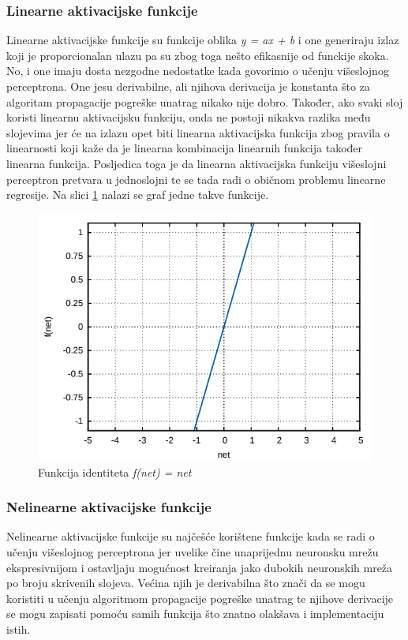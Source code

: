 \documentclass[times, utf8, zavrsni]{fer}
\begin{document}
\subsubsection{Linearne aktivacijske funkcije}
Linearne aktivacijske funkcije su funkcije oblika \textit{y = ax + b} i one generiraju izlaz koji je proporcionalan ulazu pa su zbog toga nešto efikasnije od funckije skoka. No, i one imaju dosta nezgodne nedostatke kada govorimo o učenju višeslojnog perceptrona. One jesu derivabilne, ali njihova derivacija je konstanta što za algoritam propagacije pogreške unatrag nikako nije dobro. Također, ako svaki sloj koristi linearnu aktivacijsku funkciju, onda ne postoji nikakva razlika među slojevima jer će na izlazu opet biti linearna aktivacijska funkcija zbog pravila o linearnosti koji kaže da je linearna kombinacija linearnih funkcija također linearna funkcija. Posljedica toga je da linearna aktivacijska funkciju višeslojni perceptron pretvara u jednoslojni te se tada radi o običnom problemu linearne regresije. Na slici \ref{fig:id-fun} nalazi se graf jedne takve funkcije.

\begin{figure}[H]
    \centering
    \includegraphics[scale=0.5]{img/id-fun.png}
    \caption[Caption for LOF]{Funkcija identiteta \textit{f(net) = net}\footnotemark}
    \label{fig:id-fun}
\end{figure}

\subsubsection{Nelinearne aktivacijske funkcije}
Nelinearne aktivacijske funkcije su najčešće korištene funkcije kada se radi o učenju višeslojnog perceptrona jer uvelike čine unaprijednu neuronsku mrežu ekspresivnijom i ostavljaju mogućnost kreiranja jako dubokih neuronskih mreža po broju skrivenih slojeva. Većina njih je derivabilna što znači da se mogu koristiti u učenju algoritmom propagacije pogreške unatrag te njihove derivacije se mogu zapisati pomoću samih funkcija što znatno olakšava i implementaciju istih.
\end{document}
